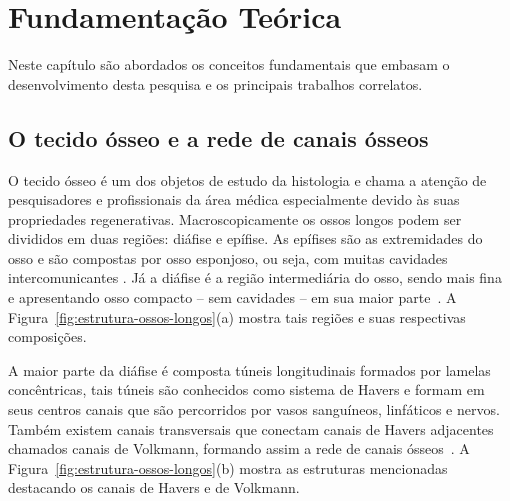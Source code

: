 \chapter[Fundamentação Teórica]{Fundamentação Teórica}

Neste capítulo são abordados os conceitos fundamentais que embasam o desenvolvimento desta pesquisa e os principais trabalhos correlatos.

\section{O tecido ósseo e a rede de canais ósseos}
O tecido ósseo é um dos objetos de estudo da histologia e chama a atenção de pesquisadores e profissionais da área médica especialmente devido às suas propriedades regenerativas. Macroscopicamente os ossos longos podem ser divididos em duas regiões: diáfise e epífise. As epífises são as extremidades do osso e são compostas por osso esponjoso, ou seja, com muitas cavidades intercomunicantes \cite{junqueira1985histologia}. Já a diáfise é a região intermediária do osso, sendo mais fina e apresentando osso compacto -- sem cavidades -- em sua maior parte~\cite{junqueira1985histologia}. A Figura~\ref{fig:estrutura-ossos-longos}(a) mostra tais regiões e suas respectivas composições.

A maior parte da diáfise é composta túneis longitudinais formados por lamelas concêntricas, tais túneis são conhecidos como sistema de Havers e formam em seus centros canais que são percorridos por vasos sanguíneos, linfáticos e nervos. Também existem canais transversais que conectam canais de Havers adjacentes chamados canais de Volkmann, formando assim a rede de canais ósseos~\cite{junqueira1985histologia}. A Figura~\ref{fig:estrutura-ossos-longos}(b) mostra as estruturas mencionadas destacando os canais de Havers e de Volkmann.


